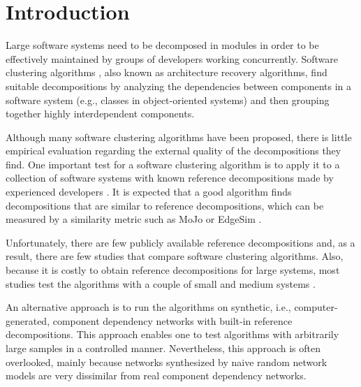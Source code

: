 \newcommand{\din}[0]{\ensuremath{\delta_{in}}}
\newcommand{\dout}[0]{\ensuremath{\delta_{out}}}


\section{Introduction} \label{sec:introduction}

Large software systems need to be decomposed in modules in order to be
effectively maintained by groups of developers working concurrently. Software
clustering algorithms \cite{Anquetil1999}, also known as architecture recovery
algorithms, find suitable decompositions by analyzing the dependencies between
components in a software system (e.g., classes in object-oriented systems) and
then grouping together highly interdependent components.

Although many software clustering algorithms have been proposed, there is
little empirical evaluation regarding the external quality of the
decompositions they find. One important test for a software clustering
algorithm is to apply it to a collection of software systems with known
reference decompositions made by experienced developers \cite{Anquetil1999}. It
is expected that a good algorithm finds decompositions that are similar to
reference decompositions, which can be measured by a similarity metric such as
MoJo or EdgeSim \cite{Mitchell2001}.

Unfortunately, there are few publicly available reference decompositions
\cite{Anquetil1999} and, as a result, there are few studies that compare
software clustering algorithms. Also, because it is costly to obtain reference
decompositions for large systems, most studies test the algorithms with a
couple of small and medium systems \cite{Anquetil1999,Bittencourt2009}.

An alternative approach is to run the algorithms on synthetic, i.e., computer-
generated, component dependency networks with built-in reference
decompositions. This approach enables one to test algorithms with arbitrarily
large samples in a controlled manner. Nevertheless, this approach is often
overlooked, mainly because networks synthesized by naive random network models
are very dissimilar from real component dependency networks.

